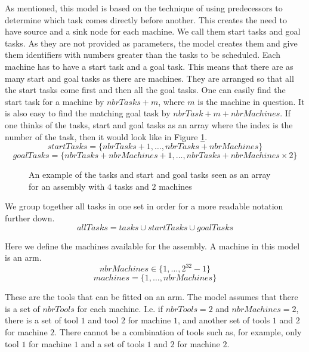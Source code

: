   \noindent As mentioned, this model is based on the technique of using predecessors to determine which task comes directly before another. This creates the need to have source and a sink node for each machine. We call them start tasks and goal tasks. As they are not provided as parameters, the model creates them and give them identifiers with numbers greater than the tasks to be scheduled. Each machine has to have a start task and a goal task. This means that there are as many start and goal tasks as there are machines. They are arranged so that all the start tasks come first and then all the goal tasks. One can easily find the start task for a machine by $nbrTasks + m$, where $m$ is the machine in question. It is also easy to find the matching goal task by $nbrTask + m + nbrMachines$. If one thinks of the tasks, start and goal tasks as an array where the index is the number of the task, then it would look  like in Figure \ref{fig:tasks_array}.
 \begin{equation}\label{eq:19}
 startTasks = \{nbrTasks+1 , \ldots , nbrTasks+nbrMachines\}
 \end{equation}
 \begin{equation}\label{eq:20}
 goalTasks = \{nbrTasks+nbrMachines+1 , \ldots , nbrTasks+nbrMachines \times 2\}
 \end{equation}

\begin{figure}
	\centering
	
	\caption{An example of the tasks and start and goal tasks seen as an array for an assembly with $4$ tasks and $2$ machines}
	\label{fig:tasks_array}
\end{figure}

\noindent We group together all tasks in one set in order for a more readable notation further down.
 \begin{equation}\label{eq:21}
 allTasks = tasks \cup startTasks \cup goalTasks
 \end{equation}

  \noindent Here we define the machines available for the assembly. A machine in this model is an arm.
 \begin{equation}\label{eq:2}
 nbrMachines \in \{1 , \ldots , 2^{32}-1\}
 \end{equation}
 \begin{equation}\label{eq:11}
 machines = \{1 , \ldots , nbrMachines\}
 \end{equation}

  \noindent These are the tools that can be fitted on an arm. The model assumes that there is a set of $nbrTools$ for each machine. I.e. if $nbrTools = 2$ and $nbrMachines = 2$, there is a set of tool $1$ and tool $2$ for machine $1$, and another set of tools $1$ and $2$ for machine $2$. There cannot be a combination of tools such as, for example, only tool $1$ for machine $1$ and a set of tools $1$ and $2$ for machine $2$.
 

